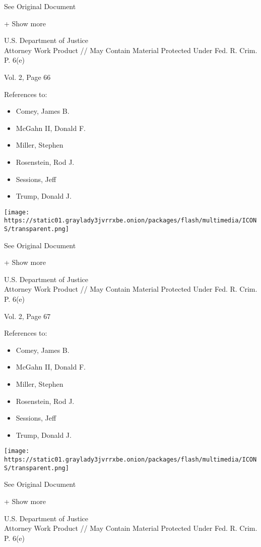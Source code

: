 See Original Document

+ Show more

U.S. Department of Justice\\
Attorney Work Product // May Contain Material Protected Under Fed. R.
Crim. P. 6(e)

Vol. 2, Page 66

References to:

\begin{itemize}
\tightlist
\item
  Comey, James B.
\item
  McGahn II, Donald F.
\item
  Miller, Stephen
\item
  Rosenstein, Rod J.
\item
  Sessions, Jeff
\item
  Trump, Donald J.
\end{itemize}

\protect\hyperlink{}{}

\texttt{[image: https://static01.graylady3jvrrxbe.onion/packages/flash/multimedia/ICONS/transparent.png]}

See Original Document

+ Show more

U.S. Department of Justice\\
Attorney Work Product // May Contain Material Protected Under Fed. R.
Crim. P. 6(e)

Vol. 2, Page 67

References to:

\begin{itemize}
\tightlist
\item
  Comey, James B.
\item
  McGahn II, Donald F.
\item
  Miller, Stephen
\item
  Rosenstein, Rod J.
\item
  Sessions, Jeff
\item
  Trump, Donald J.
\end{itemize}

\protect\hyperlink{}{}

\texttt{[image: https://static01.graylady3jvrrxbe.onion/packages/flash/multimedia/ICONS/transparent.png]}

See Original Document

+ Show more

U.S. Department of Justice\\
Attorney Work Product // May Contain Material Protected Under Fed. R.
Crim. P. 6(e)

